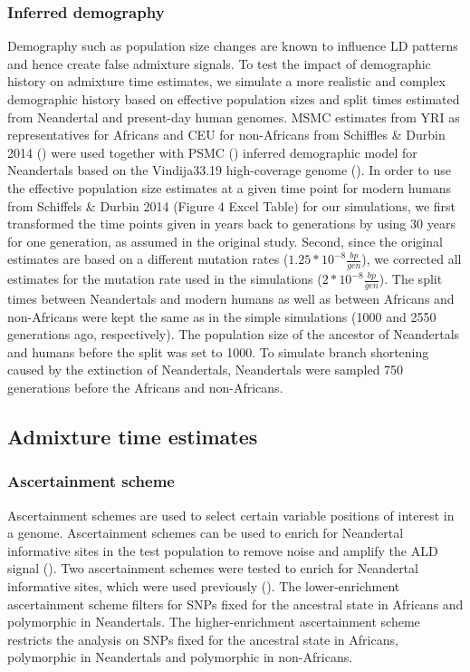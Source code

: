 \documentclass[]{article}
\begin{document}
\subsubsection{Inferred demography}\label{inferred demography}

Demography such as population size changes are known to influence LD
patterns and hence create false admixture signals. To test the impact of
demographic history on admixture time estimates, we simulate a more
realistic and complex demographic history based on effective population
sizes and split times estimated from Neandertal and present-day human
genomes. MSMC estimates from YRI as representatives for Africans and CEU
for non-Africans from Schiffles \& Durbin 2014
(\cite{schiffels_inferring_2014}) were used together with PSMC
(\cite{li_inference_2011}) inferred demographic model for Neandertals
based on the Vindija33.19 high-coverage genome
(\cite{prufer_high-coverage_2017}). In order to use the effective
population size estimates at a given time point for modern humans from
Schiffels \& Durbin 2014 (Figure 4 Excel Table) for our simulations, we
first transformed the time points given in years back to generations by
using 30 years for one generation, as assumed in the original study.
Second, since the original estimates are based on a different mutation
rates (\(1.25*10^{-8} \frac{bp}{gen}\)), we corrected all estimates for
the mutation rate used in the simulations
(\(2*10^{-8} \frac{bp}{gen}\)). The split times between Neandertals and
modern humans as well as between Africans and non-Africans were kept the
same as in the simple simulations (1000 and 2550 generations ago,
respectively). The population size of the ancestor of Neandertals and
humans before the split was set to 1000. To simulate branch shortening
caused by the extinction of Neandertals, Neandertals were sampled 750
generations before the Africans and non-Africans.

\subsection{Admixture time estimates}\label{admixture time estimates}

\subsubsection{Ascertainment scheme}\label{asceteinment scheme}

Ascertainment schemes are used to select certain variable positions of
interest in a genome. Ascertainment schemes can be used to enrich for
Neandertal informative sites in the test population to remove noise and
amplify the ALD signal (\cite{sankararaman_date_2012}). Two
ascertainment schemes were tested to enrich for Neandertal informative
sites, which were used previously
(\cite{sankararaman_date_2012,fu_genome_2014}). The lower-enrichment
ascertainment scheme filters for SNPs fixed for the ancestral state in
Africans and polymorphic in Neandertals. The higher-enrichment
ascertainment scheme restricts the analysis on SNPs fixed for the
ancestral state in Africans, polymorphic in Neandertals and polymorphic
in non-Africans.
\end{document}
